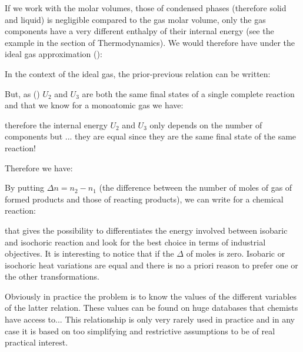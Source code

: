 	If we work with the molar volumes, those of condensed phases (therefore solid and liquid) is negligible compared to the gas molar volume, only the gas components have a very different enthalpy of their internal energy (see the example in the section of Thermodynamics). We would therefore have under the ideal gas approximation ():
	
	In the context of the ideal gas, the prior-previous relation can be written:
	
	But, as () $U_2$ and $U_3$ are both the same final states of a single complete reaction and that we know for a monoatomic gas we have:
	
	therefore the internal energy $U_2$ and $U_3$ only depends on the number of components but ... they are equal since they are the same final state of the same reaction!
	
	Therefore we have:
	
	By putting $\Delta n=n_2-n_1$ (the difference between the number of moles of gas of formed products and those of reacting products), we can write for a chemical reaction:
	
	that gives the possibility to differentiates the energy involved between isobaric and isochoric reaction and look for the best choice in terms of industrial objectives. It is interesting to notice that if the $\Delta$ of moles is zero. Isobaric or isochoric heat variations are equal and there is no a priori reason to prefer one or the other transformations.
	
	Obviously in practice the problem is to know the values of the different variables of the latter relation. These values can be found on huge databases that chemists have access to... This relationship is only very rarely used in practice and in any case it is based on too simplifying and restrictive assumptions to be of real practical interest.
	
	\pagebreak
